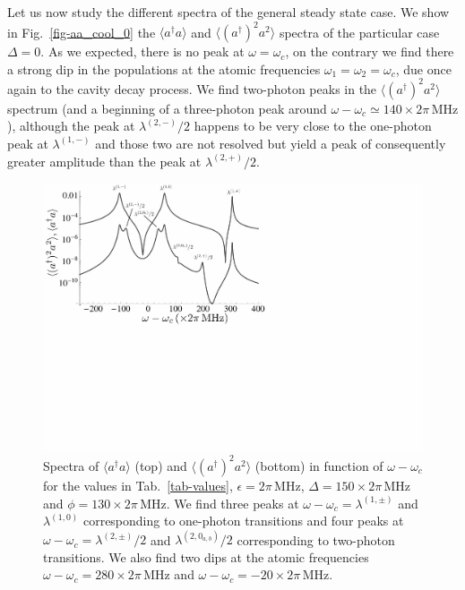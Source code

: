 Let us now study the different spectra of the general steady state case. We show in Fig.~\ref{fig-aa_cool_0} the $\langle a^\dagger a \rangle$ and $\langle (a^\dagger)^2 a^2 \rangle$ spectra of the particular case $\Delta=0$. As we expected, there is no peak at  $\omega = \omega_c$, on the contrary we find there a strong dip in the populations at the atomic frequencies $\omega_1=\omega_2=\omega_c$, due once again to the cavity decay process. We find two-photon peaks in the $\langle (a^\dagger)^2 a^2 \rangle$ spectrum (and a beginning of a three-photon peak around $\omega-\omega_c \simeq 140\times 2\pi\,\mbox{MHz}$), although the peak at $\lambda^{(2,-)}/2$ happens to be very close to the one-photon peak at $\lambda^{(1,-)}$ and those two are not resolved but yield a peak of consequently greater amplitude than the peak at $\lambda^{(2,+)}/2$.

\begin{figure}
\center
\includegraphics[width=0.74 \textwidth]{Images/chap5/aa_cool_150.pdf}
\caption[$\langle a^\dagger a \rangle$ and $\langle (a^\dagger)^2 a^2 \rangle$ in function of $\omega-\omega_c$ ]{Spectra of $\langle a^\dagger a \rangle$ (top) and $\langle (a^\dagger)^2 a^2 \rangle$ (bottom) in function of $\omega-\omega_c$ for the values in Tab.~\ref{tab-values}, $\epsilon= 2\pi\,\mbox{MHz}$, $\Delta=150 \times 2\pi\,\mbox{MHz}$ and $\phi=130\times 2\pi\,\mbox{MHz}$.  We find three peaks at $\omega-\omega_c=\lambda^{(1,\pm)}$ and $\lambda^{(1,0)}$ corresponding to one-photon transitions and four peaks at $\omega-\omega_c = \lambda^{(2,\pm)}/2$ and $\lambda^{(2,0_{a,b})}/2$ corresponding to two-photon transitions. We also find two dips at the atomic frequencies $\omega-\omega_c=280 \times 2\pi\,\mbox{MHz}$ and $\omega-\omega_c=-20 \times 2\pi\,\mbox{MHz}$.}
\label{fig-aa_cool_150}
\end{figure}

